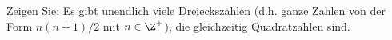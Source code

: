 
\begin{exercise}

Zeigen Sie: Es gibt unendlich viele Dreieckszahlen (d.h. ganze Zahlen von 
der Form $n(n+1)/2$ mit $n \in \Z^+$), die gleichzeitig Quadratzahlen sind.

\end{exercise}


\begin{solution}

\phantom{}

\end{solution}

